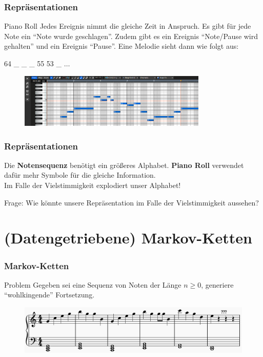 \documentclass[aspectratio=169]{beamer}
\begin{document}
\begin{frame}
	\frametitle{Repräsentationen}
	
	\begin{block}{Piano Roll}
		Jedes Ereignis nimmt die gleiche Zeit in Anspruch. Es gibt für jede Note ein ``Note wurde geschlagen''.
		Zudem gibt es ein Ereignis ``Note/Pause wird gehalten'' und ein Ereignis ``Pause''.
		Eine Melodie sieht dann wie folgt aus:
		\begin{center}
			64 \_ \_ \_ 55 53 \_ $\ldots$
		\end{center}
	\end{block}
	
	\begin{figure}
		\includegraphics[width=0.8\textwidth]{piano-roll-notation}
	\end{figure}
\end{frame}

\begin{frame}
	\frametitle{Repräsentationen}
	Die \textbf{Notensequenz} benötigt ein größeres Alphabet. \textbf{Piano Roll} verwendet dafür mehr Symbole für die gleiche Information.\\
	\vspace{1cm}
	Im Falle der Vielstimmigkeit explodiert unser Alphabet!\\
	\vspace{1cm}
	\begin{block}{Frage:}
		Wie könnte unsere Repräsentation im Falle der Vielstimmigkeit aussehen?
	\end{block}
\end{frame}

\section{(Datengetriebene) Markov-Ketten}

\begin{frame}
	\frametitle{Markov-Ketten}
	\begin{block}{Problem}
		Gegeben sei eine Sequenz von Noten der Länge $n \geq 0$, generiere ``wohlkingende'' Fortsetzung.
	\end{block}
	\begin{figure}
		\includegraphics[width=\textwidth]{notes}
	\end{figure}
\end{frame}
\end{document}
